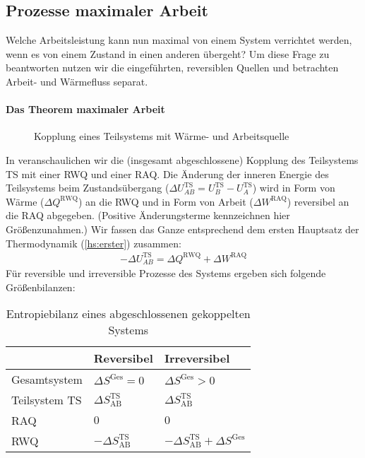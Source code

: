 \subsection{Prozesse maximaler Arbeit}
Welche Arbeitsleistung kann nun maximal von einem System verrichtet werden, wenn es von einem Zustand in einen anderen übergeht? 
Um diese Frage zu beantworten nutzen wir die eingeführten, reversiblen Quellen und betrachten Arbeit- und Wärmefluss separat. 

\paragraph*{Das Theorem maximaler Arbeit}
\begin{figure}[htbp]
    \centering
    \tfigTheoremMaximizedWork
    \caption{Kopplung eines Teilsystems mit Wärme- und Arbeitsquelle}
    \label{fig:MaximaleArbeit}
\end{figure}
In  veranschaulichen wir die (insgesamt abgeschlossene) Kopplung des Teilsystems TS mit einer RWQ und einer RAQ. Die Änderung der inneren Energie des Teilsystems beim Zustandsübergang ($\Delta U^{\mathrm{TS}}_{AB}=U^{\mathrm{TS}}_{B}-U^{\mathrm{TS}}_{A}$) wird in Form von Wärme ($\Delta Q^{\mathrm{RWQ}}$) an die RWQ und in Form von Arbeit ($\Delta W^{\mathrm{RAQ}}$) reversibel an die RAQ abgegeben. (Positive Änderungsterme kennzeichnen hier Größenzunahmen.) Wir fassen das Ganze entsprechend dem ersten Hauptsatz der Thermodynamik (\ref{hs:erster}) zusammen:
\begin{align}
    \label{eq:maximaleArbeit}
    -\Delta U^{\mathrm{TS}}_{AB}=\Delta Q^{\mathrm{RWQ}}+\Delta W^{\mathrm{RAQ}}
\end{align}
Für reversible und irreversible Prozesse des Systems ergeben sich folgende Größenbilanzen:
\renewcommand*{\arraystretch}{1.3}
\begin{table}[b]
    \centering
    \caption{Entropiebilanz eines abgeschlossenen gekoppelten Systems}
    \begin{tabularx}{.5\textwidth}{|l|X|l|}
        \hline
        \rowcolor{formalshade!98!blue}
        &Reversibel &Irreversibel\\
        \hline
        \rowcolor{formalshade}
        Gesamtsystem&$\Delta S^\mathrm{Ges}=0$&$\Delta S^\mathrm{Ges}>0$\\
        \rowcolor{formalshade!80!white}
        Teilsystem TS&$\Delta S^{\mathrm{TS}}_{\mathrm{AB}}$&$\Delta S^{\mathrm{TS}}_{\mathrm{AB}}$\\
        \rowcolor{formalshade}
        RAQ&$0$&$0$\\
        \rowcolor{formalshade!80!white}
        RWQ&$-\Delta S^{\mathrm{TS}}_\mathrm{AB}$&$-\Delta S^{\mathrm{TS}}_\mathrm{AB}+\Delta S^\mathrm{Ges}$\\
        \hline
    \end{tabularx} 
    \label{tab:Entropiebilanz}
\end{table}
